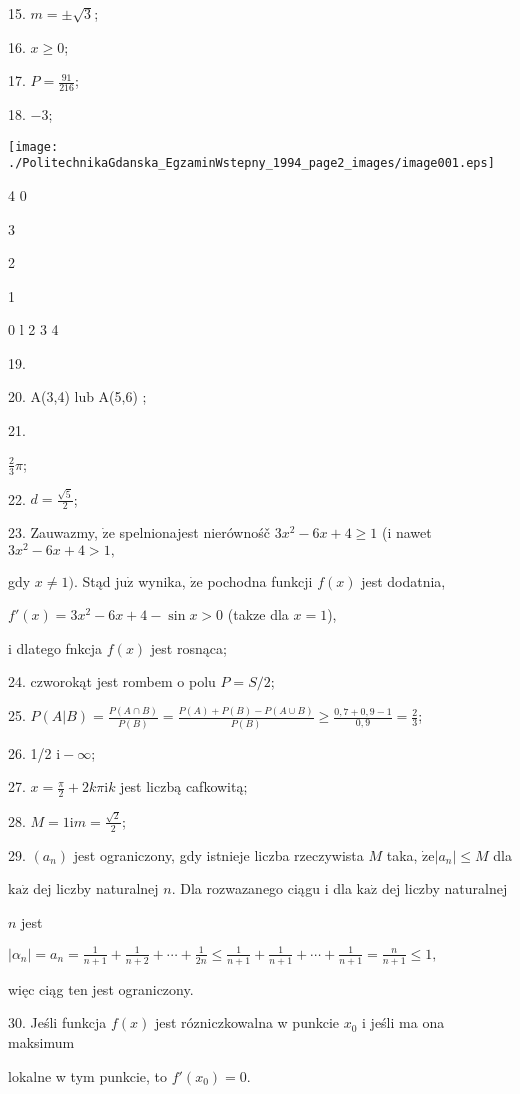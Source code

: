 \documentclass[a4paper,12pt]{article}
\begin{document}
15. $m=\pm\sqrt{3}$;

16. $x\geq 0$;

17. $P=\displaystyle \frac{91}{216}$;

18. $-3$;
\begin{center}
\texttt{[image: ./PolitechnikaGdanska\_EgzaminWstepny\_1994\_page2\_images/image001.eps]}
\end{center}
4  0

3

2

1

0 l  2 3 4

19.

20. A(3,4) lub A(5,6) ;

21.

$\displaystyle \frac{2}{3}\pi$;





22. $d=\displaystyle \frac{\sqrt{5}}{2}$;

23. Zauwazmy, $\dot{\mathrm{z}}\mathrm{e}$ spelnionajest nierównośč $3x^{2}-6x+4\geq 1$ (i nawet $3x^{2}-6x+4>1,$

gdy $x\neq 1)$. Stąd $\mathrm{j}\mathrm{u}\dot{\mathrm{z}}$ wynika, $\dot{\mathrm{z}}\mathrm{e}$ pochodna funkcji $f(x)$ jest dodatnia,

$f'(x)=3x^{2}-6x+4-\sin x>0$ (takze dla $x=1$),

i dlatego fnkcja $f(x)$ jest rosnąca;

24. czworokąt jest rombem o polu $P=S/2$;

25. $P(A|B)=\displaystyle \frac{P(A\cap B)}{P(B)}=\frac{P(A)+P(B)-P(A\cup B)}{P(B)}\geq\frac{0,7+0,9-1}{0,9}=\frac{2}{3}$;

26. 1/2 $\mathrm{i}-\infty$;

27. $x=\displaystyle \frac{\pi}{2}+2k\pi \mathrm{i}k$ jest liczbą cafkowitą;

28. $M=1\displaystyle \mathrm{i}m=\frac{\sqrt{2}}{2}$;

29. $(a_{n})$ jest ograniczony, gdy istnieje liczba rzeczywista $M$ taka, $\dot{\mathrm{z}}\mathrm{e} |a_{n}| \leq M$ dla

$\mathrm{k}\mathrm{a}\dot{\mathrm{z}}$ dej liczby naturalnej $n$. Dla rozwazanego ciągu i dla $\mathrm{k}\mathrm{a}\dot{\mathrm{z}}$ dej liczby naturalnej

$n$ jest

$|\displaystyle \alpha_{n}|=a_{n}=\frac{1}{n+1}+\frac{1}{n+2}+\cdots+\frac{1}{2n}\leq\frac{1}{n+1}+\frac{1}{n+1}+\cdots+\frac{1}{n+1}=\frac{n}{n+1}\leq 1,$

więc ciąg ten jest ograniczony.

30. Jeśli funkcja $f(x)$ jest rózniczkowalna w punkcie $x_{0}$ i jeśli ma ona maksimum

lokalne w tym punkcie, to $f'(x_{0})=0.$
\end{document}
